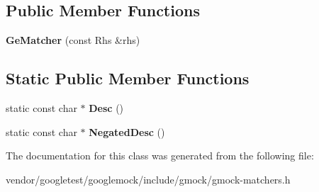 \subsection*{Public Member Functions}
\begin{DoxyCompactItemize}
\item 
{\bfseries Ge\+Matcher} (const Rhs \&rhs)\hypertarget{classtesting_1_1internal_1_1GeMatcher_aba23cbb4040d08be1a9db09b73906182}{}\label{classtesting_1_1internal_1_1GeMatcher_aba23cbb4040d08be1a9db09b73906182}

\end{DoxyCompactItemize}
\subsection*{Static Public Member Functions}
\begin{DoxyCompactItemize}
\item 
static const char $\ast$ {\bfseries Desc} ()\hypertarget{classtesting_1_1internal_1_1GeMatcher_a5676836bfa354f4398dd083621a05877}{}\label{classtesting_1_1internal_1_1GeMatcher_a5676836bfa354f4398dd083621a05877}

\item 
static const char $\ast$ {\bfseries Negated\+Desc} ()\hypertarget{classtesting_1_1internal_1_1GeMatcher_a028847a76dbf02b8da3d56ce448ef053}{}\label{classtesting_1_1internal_1_1GeMatcher_a028847a76dbf02b8da3d56ce448ef053}

\end{DoxyCompactItemize}


The documentation for this class was generated from the following file\+:\begin{DoxyCompactItemize}
\item 
vendor/googletest/googlemock/include/gmock/gmock-\/matchers.\+h\end{DoxyCompactItemize}
